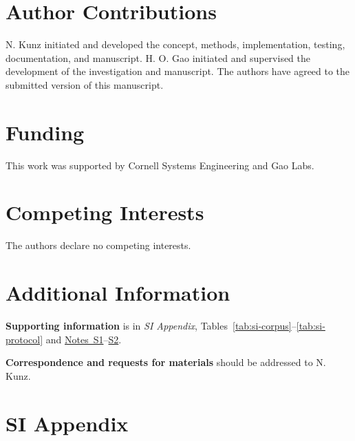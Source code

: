\documentclass{article}
\begin{document}
\section*{Author Contributions}
\label{sec:authors}
N. Kunz initiated and developed the concept, methods, implementation, testing, documentation, and manuscript. H. O. Gao initiated and supervised the development of the investigation and manuscript. The authors have agreed to the submitted version of this manuscript.

\section*{Funding}
\label{sec:funding}
This work was supported by Cornell Systems Engineering and Gao Labs.

\section*{Competing Interests}
\label{sec:competing}
The authors declare no competing interests.

\section*{Additional Information}
\label{sec:additional}
\textbf{Supporting information} is in \textit{SI Appendix}, Tables~\ref{tab:si-corpus}--\ref{tab:si-protocol} and \hyperref[sec:si-note-bipartite]{Notes~S1}--\hyperref[sec:si-note-processing]{S2}.

\textbf{Correspondence and requests for materials} should be addressed to N. Kunz.

\newpage



\clearpage
\begingroup
\renewcommand{\tablename}{Table}
\renewcommand{\thetable}{S\arabic{table}}
\renewcommand{\theHtable}{supp.\arabic{table}}
\setcounter{table}{0}
\captionsetup[table]{font=footnotesize,labelfont=bf,labelsep=period,justification=raggedright,singlelinecheck=false}
\setlength{\tabcolsep}{3pt}
\renewcommand{\arraystretch}{1.15}
\footnotesize

\section*{SI Appendix}
\begingroup
\captionsetup{hypcap=false}
\label{tab:si-corpus}
\endgroup
\end{document}
